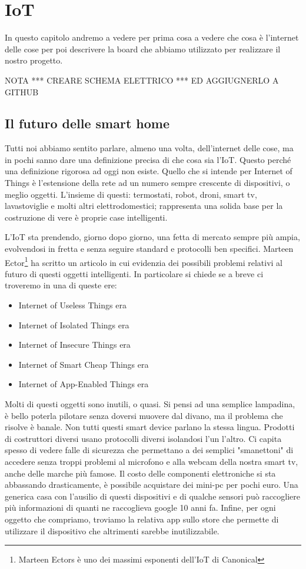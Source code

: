 \chapter{IoT}
In questo capitolo andremo a vedere per prima cosa a vedere che cosa è l'internet delle cose per poi descrivere la board che abbiamo utilizzato per realizzare il nostro progetto. 

{\Huge NOTA *** CREARE SCHEMA ELETTRICO *** ED AGGIUGNERLO A GITHUB}


\section{Il futuro delle smart home}
Tutti noi abbiamo sentito parlare, almeno una volta, dell'internet delle cose,
ma in pochi sanno dare una definizione precisa di che cosa sia l'IoT.
Questo perché una definizione rigorosa ad oggi non esiste.
Quello che si intende per Internet of Things è l'estensione della rete ad un numero sempre crescente di dispositivi, o meglio oggetti.
L'insieme di questi: termostati, robot, droni, smart tv, lavastoviglie e molti altri elettrodomestici; rappresenta una solida base per la costruzione di vere è proprie case intelligenti.

L'IoT sta prendendo, giorno dopo giorno, una fetta di mercato sempre più ampia, evolvendosi in fretta e senza seguire standard e protocolli ben specifici. 
Marteen Ector\footnote{Marteen Ectors è uno dei massimi esponenti dell'IoT di  Canonical} ha scritto un articolo\cite{smart} in cui evidenzia dei possibili problemi relativi al futuro di questi oggetti intelligenti.
In particolare si chiede se a breve ci troveremo in una di queste ere:
\begin{itemize}
\item Internet of Useless Things era
\item Internet of Isolated Things era
\item Internet of Insecure Things era
\item Internet of Smart Cheap Things era
\item Internet of App-Enabled Things era
\end{itemize}
Molti di questi oggetti sono inutili, o quasi. Si pensi ad una semplice lampadina, è bello poterla pilotare senza doversi muovere dal divano, ma il problema che risolve è banale.
Non tutti questi smart device parlano la stessa lingua. Prodotti di costruttori diversi usano protocolli diversi isolandosi l'un l'altro.
Ci capita spesso di vedere falle di sicurezza che permettano a dei semplici "smanettoni" di accedere senza troppi problemi al microfono e alla webcam della nostra smart tv, anche delle marche più famose.
Il costo delle componenti elettroniche si sta abbassando drasticamente, è possibile acquistare dei mini-pc per pochi euro. Una generica casa con l'ausilio di questi dispositivi e di qualche sensori può raccogliere più informazioni di quanti ne raccoglieva google 10 anni fa.
Infine, per ogni oggetto che compriamo, troviamo la relativa app sullo store che permette di utilizzare il dispositivo che altrimenti sarebbe inutilizzabile.

